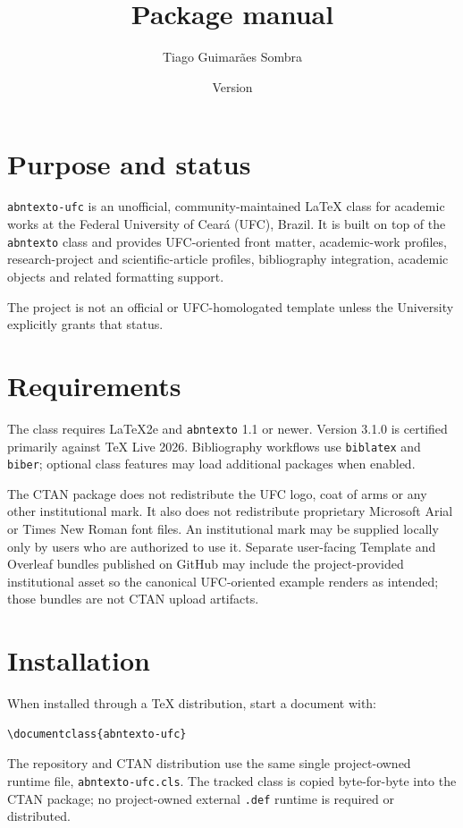 \documentclass[11pt,a4paper]{article}
\title{\pkg\\Package manual}
\author{Tiago Guimarães Sombra}
\date{Version \version}
\newcommand{\pkg}{\texttt{abntexto-ufc}}
\newcommand{\upstream}{\texttt{abntexto}}
\newcommand{\version}{3.1.0}
\begin{document}
\maketitle

\section{Purpose and status}

\pkg{} is an unofficial, community-maintained LaTeX class for academic works at the Federal University of Ceará (UFC), Brazil. It is built on top of the \upstream{} class and provides UFC-oriented front matter, academic-work profiles, research-project and scientific-article profiles, bibliography integration, academic objects and related formatting support.

The project is not an official or UFC-homologated template unless the University explicitly grants that status.

\section{Requirements}

The class requires LaTeX2e and \upstream{} 1.1 or newer. Version \version{} is certified primarily against TeX Live 2026. Bibliography workflows use \texttt{biblatex} and \texttt{biber}; optional class features may load additional packages when enabled.

The CTAN package does not redistribute the UFC logo, coat of arms or any other institutional mark. It also does not redistribute proprietary Microsoft Arial or Times New Roman font files. An institutional mark may be supplied locally only by users who are authorized to use it. Separate user-facing Template and Overleaf bundles published on GitHub may include the project-provided institutional asset so the canonical UFC-oriented example renders as intended; those bundles are not CTAN upload artifacts.

\section{Installation}

When installed through a TeX distribution, start a document with:

\begin{Verbatim}[frame=single]
\documentclass{abntexto-ufc}
\end{Verbatim}

The repository and CTAN distribution use the same single project-owned runtime file, \texttt{abntexto-ufc.cls}. The tracked class is copied byte-for-byte into the CTAN package; no project-owned external \texttt{.def} runtime is required or distributed.
\end{document}
